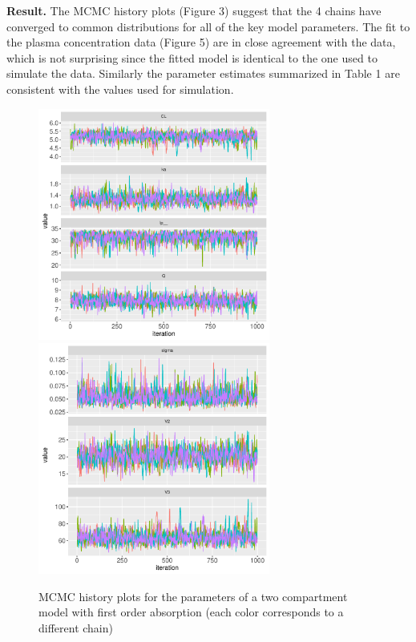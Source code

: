 \documentclass[11pt]{amsart}
\begin{document}
\textbf{Result.} The MCMC history plots (Figure 3) suggest that the 4 chains have converged to common distributions for all of the key model parameters. The  fit to the plasma concentration data (Figure 5) are in close agreement with the data, which is not surprising since the fitted model is identical to the one used to simulate the data. Similarly the parameter estimates summarized in Table 1 are consistent with the values used for simulation.

\begin{figure}[htbp]
\includegraphics[width=3.0in,trim=0in 0in 0 0in]{graphics/TwoCptModelExamplePlots001.pdf}
\includegraphics[width=3.0in,trim=0in 0in 0 0in]{graphics/TwoCptModelExamplePlots002.pdf}
\caption{{MCMC history plots for the parameters of a two compartment model with first order absorption (each color corresponds to a different chain)}}
\label{MCMC1}
\end{figure}
\end{document}
